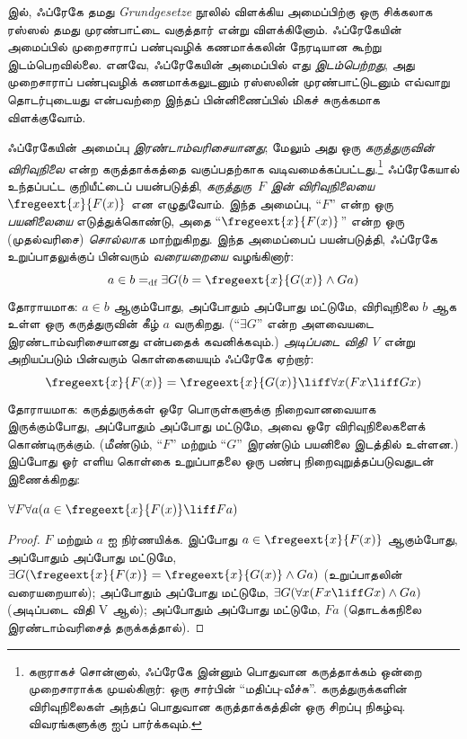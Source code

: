 \documentclass[../../../include/open-logic-section]{subfiles}
\begin{document}


 இல், ஃப்ரேகே தமது \emph{Grundgesetze} நூலில்
விளக்கிய அமைப்பிற்கு ஒரு சிக்கலாக ரஸ்ஸல் தமது முரண்பாட்டை வகுத்தார்
என்று விளக்கினோம். ஃப்ரேகேயின் அமைப்பில் முறைசாராப் பண்புவழிக்
கணமாக்கலின் நேரடியான கூற்று இடம்பெறவில்லை. எனவே, ஃப்ரேகேயின் அமைப்பில்
எது \emph{இடம்பெற்றது}, அது முறைசாராப் பண்புவழிக் கணமாக்கலுடனும்
ரஸ்ஸலின் முரண்பாட்டுடனும் எவ்வாறு தொடர்புடையது என்பவற்றை இந்தப்
பின்னிணைப்பில் மிகச் சுருக்கமாக விளக்குவோம்.

ஃப்ரேகேயின் அமைப்பு \emph{இரண்டாம்வரிசையானது}; மேலும் அது ஒரு
\emph{கருத்துருவின் விரிவுநிலை} என்ற கருத்தாக்கத்தை வகுப்பதற்காக
வடிவமைக்கப்பட்டது.\footnote{கறாராகச் சொன்னால், ஃப்ரேகே இன்னும் பொதுவான
கருத்தாக்கம் ஒன்றை முறைசாராக்க முயல்கிறார்: ஒரு சார்பின்
“மதிப்பு-வீச்சு”. கருத்துருக்களின் விரிவுநிலைகள் அந்தப் பொதுவான
கருத்தாக்கத்தின் ஒரு சிறப்பு நிகழ்வு. விவரங்களுக்கு
\citet[pp.\ 8--9]{Heck2012} ஐப் பார்க்கவும்.} ஃப்ரேகேயால்
உந்தப்பட்ட குறியீட்டைப் பயன்படுத்தி, \emph{கருத்துரு~$F$ இன்
விரிவுநிலையை} $\fregeext{x}{F(x)}$ என எழுதுவோம். இந்த அமைப்பு,
“$F$” என்ற ஒரு \emph{பயனிலையை} எடுத்துக்கொண்டு, அதை
“$\fregeext{x}{F(x)}$” என்ற ஒரு (முதல்வரிசை) \emph{சொல்லாக}
மாற்றுகிறது. இந்த அமைப்பைப் பயன்படுத்தி, ஃப்ரேகே உறுப்பாதலுக்குப்
பின்வரும் \emph{வரையறையை} வழங்கினார்:
\[
	a \in b =_\text{df} \exists G(b = \fregeext{x}{G(x)} \land Ga)
\]
தோராயமாக: $a \in b$ ஆகும்போது, அப்போதும் அப்போது மட்டுமே, விரிவுநிலை
$b$ ஆக உள்ள ஒரு கருத்துருவின் கீழ் $a$ வருகிறது. (“$\exists G$” என்ற
அளவையடை இரண்டாம்வரிசையானது என்பதைக் கவனிக்கவும்.) \emph{அடிப்படை
விதி V} என்று அறியப்படும் பின்வரும் கொள்கையையும் ஃப்ரேகே ஏற்றார்:
$$\fregeext{x}{F(x)} = \fregeext{x}{G(x)} \liff \forall x (Fx \liff Gx)$$
தோராயமாக: கருத்துருக்கள் ஒரே பொருள்களுக்கு நிறைவானவையாக இருக்கும்போது,
அப்போதும் அப்போது மட்டுமே, அவை ஒரே விரிவுநிலைகளைக் கொண்டிருக்கும்.
(மீண்டும், “$F$” மற்றும் “$G$” இரண்டும் பயனிலை இடத்தில் உள்ளன.)
இப்போது ஓர் எளிய கொள்கை உறுப்பாதலை ஒரு பண்பு நிறைவுறுத்தப்படுவதுடன்
இணைக்கிறது:

\begin{lem}
$\forall F \forall a(a \in \fregeext{x}{F(x)} \liff Fa)$
\end{lem}

\begin{proof} 
$F$ மற்றும் $a$ ஐ நிர்ணயிக்க. இப்போது $a \in \fregeext{x}{F(x)}$
ஆகும்போது, அப்போதும் அப்போது மட்டுமே, $\exists G(\fregeext{x}{F(x)}
= \fregeext{x}{G(x)} \land Ga)$ (உறுப்பாதலின் வரையறையால்);
அப்போதும் அப்போது மட்டுமே, $\exists G(\forall x(Fx \liff Gx) \land Ga)$
(அடிப்படை விதி V ஆல்); அப்போதும் அப்போது மட்டுமே, $Fa$
(தொடக்கநிலை இரண்டாம்வரிசைத் தருக்கத்தால்).
\end{proof}
\end{document}

